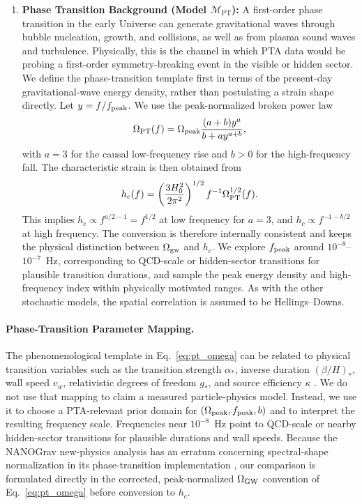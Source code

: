 \documentclass[symmetry,article,submit,pdftex,moreauthors]{Definitions/mdpi}
\begin{document}
\begin{enumerate}
    \item \textbf{Phase Transition Background (Model $\mathcal{M}_\mathrm{PT}$):} A first-order phase transition in the early Universe can generate gravitational waves through bubble nucleation, growth, and collisions, as well as from plasma sound waves and turbulence. Physically, this is the channel in which PTA data would be probing a first-order symmetry-breaking event in the visible or hidden sector. We define the phase-transition template first in terms of the present-day gravitational-wave energy density, rather than postulating a strain shape directly. Let $y=f/f_{\rm peak}$. We use the peak-normalized broken power law
    \begin{equation}\label{eq:pt_omega}
        \Omega_{\rm PT}(f)=\Omega_{\rm peak}
        \frac{(a+b)y^a}{b+a y^{a+b}},
    \end{equation}
    with $a=3$ for the causal low-frequency rise and $b>0$ for the high-frequency fall. The characteristic strain is then obtained from
    \begin{equation}\label{eq:omega_to_hc}
        h_c(f)=\left(\frac{3H_0^2}{2\pi^2}\right)^{1/2} f^{-1}\Omega_{\rm PT}^{1/2}(f).
    \end{equation}
    This implies $h_c\propto f^{a/2-1}=f^{1/2}$ at low frequency for $a=3$, and $h_c\propto f^{-1-b/2}$ at high frequency. The conversion is therefore internally consistent and keeps the physical distinction between $\Omega_{\rm gw}$ and $h_c$. We explore $f_{\rm peak}$ around $10^{-8}$--$10^{-7}$~Hz, corresponding to QCD-scale or hidden-sector transitions for plausible transition durations, and sample the peak energy density and high-frequency index within physically motivated ranges. As with the other stochastic models, the spatial correlation is assumed to be Hellings--Downs.
    \end{enumerate}

\paragraph{Phase-Transition Parameter Mapping.}
The phenomenological template in Eq.~\eqref{eq:pt_omega} can be related to physical transition variables such as the transition strength $\alpha_*$, inverse duration $(\beta/H)_*$, wall speed $v_w$, relativistic degrees of freedom $g_*$, and source efficiency $\kappa$ \cite{Caprini2018}. We do not use that mapping to claim a measured particle-physics model. Instead, we use it to choose a PTA-relevant prior domain for $(\Omega_{\rm peak},f_{\rm peak},b)$ and to interpret the resulting frequency scale. Frequencies near $10^{-8}$~Hz point to QCD-scale or nearby hidden-sector transitions for plausible durations and wall speeds. Because the NANOGrav new-physics analysis has an erratum concerning spectral-shape normalization in its phase-transition implementation \cite{NANOGrav15-NewPhys,NANOGrav15-NewPhysErratum}, our comparison is formulated directly in the corrected, peak-normalized $\Omega_{\rm GW}$ convention of Eq.~\eqref{eq:pt_omega} before conversion to $h_c$.
\end{document}
